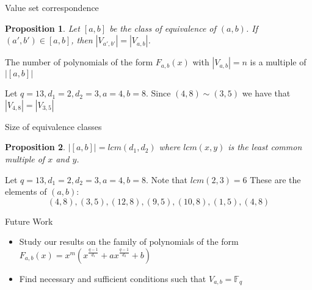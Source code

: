 \documentclass{beamer}
\newtheorem{proposition}{Proposition}
\begin{document}
\begin{frame}{Value set correspondence}
  \begin{proposition}

    Let $[a, b]$ be the class of equivalence of $(a, b)$. If $(a', b') \in [a, b]$,
     then $|V_{a', b'}| = |V_{a, b}|$.

  \end{proposition}

  \begin{corollary}
    The number of polynomials of the form $F_{a, b}(x)$ with $|V_{a, b}| = n$ is a multiple of $|[a, b]|$
  \end{corollary}

  \begin{example}
    Let $q = 13, d_1 = 2, d_2 = 3, a = 4, b = 8$. Since $(4,8) \sim (3,5)$ we have that $|V_{4, 8}| = |V_{3, 5}|$
  \end{example}

\end{frame}

\begin{frame}{Size of equivalence classes}
  
  \begin{proposition}
    $|[a, b]| = lcm(d_1,d_2)$ where $lcm(x,y)$ is the least common multiple of $x$ and $y$.
  \end{proposition}

  \begin{example}
    Let $q = 13, d_1 = 2, d_2 = 3, a = 4, b = 8$. Note that $lcm(2,3) = 6$ These are the elements of $(a,b)$:
    $$ (4, 8), (3, 5), (12, 8), (9, 5), (10, 8), (1, 5), (4,8) $$
  \end{example}
\end{frame}


\begin{frame}{Future Work}
  \begin{itemize}
    \item Study our results on the family of polynomials of the form $F_{a,b}(x) = x^m(x^{\frac{q-1}{d_1}} + ax^{\frac{q-1}{d_2}} +b)$
    \item Find necessary and sufficient conditions such that $V_{a,b} = \mathbb{F}_q$
  \end{itemize}
\end{frame}

\end{document}
